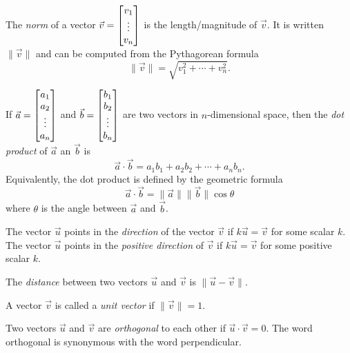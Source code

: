 \begin{SaveDefinition}[key=Norm, title={Norm}]
	The
	\emph{norm} of a vector $\vec v=\begin{bmatrix}v_1\\\vdots\\v_n\end{bmatrix}$ is the length/magnitude
	of $\vec v$. It is written $\|\vec v\|$ and can be computed from the Pythagorean
	formula
	\[
		\|\vec v\|=\sqrt{v_1^2+\cdots +v_n^2}.
	\]

\end{SaveDefinition}

\begin{SaveDefinition}[key=DotProduct, title={Dot Product}]
	If $\vec a=\begin{bmatrix}a_1\\a_2\\ \vdots\\a_n\end{bmatrix}$ and
	$\vec b=\begin{bmatrix}b_1\\b_2\\ \vdots\\b_n\end{bmatrix}$ are two vectors in $n$-dimensional
	space, then the
	\emph{dot product} of $\vec a$ an $\vec b$ is
	\[
		\vec a\cdot\vec b = a_{1}b_{1}+a_{2}b_{2}+\cdots+a_{n}b_{n}.
	\]
	 Equivalently, the dot product is defined by the geometric formula
	\[
		\vec a\cdot \vec b = \|\vec a\|\|\vec b\|\cos \theta
	\]
	 where $\theta$ is the angle between $\vec a$ and $\vec b$.
\end{SaveDefinition}

\begin{SaveDefinition}[key=Direction, title={Direction}]
	The vector $\vec u$ points in the \emph{direction} of
	the vector $\vec v$ if $k\vec u=\vec v$ for some scalar $k$.
	The vector $\vec u$ points in the \emph{positive direction} of
	$\vec v$ if $k\vec u=\vec v$ for some positive scalar $k$.
\end{SaveDefinition}

\begin{SaveDefinition}[key=Distance, title={Distance}]
	The
	\emph{distance} between two vectors $\vec u$ and $\vec v$ is
	$\|\vec u-\vec v\|$.
\end{SaveDefinition}

\begin{SaveDefinition}[key=UnitVector, title={Unit Vector}]
	A vector $\vec v$ is called a
	\emph{unit vector} if $\|\vec v\|=1$.
\end{SaveDefinition}

\begin{SaveDefinition}[key=Orthogonal, title={Orthogonal}]
	Two vectors $\vec u$ and $\vec v$ are
	\emph{orthogonal} to each other if $\vec u\cdot \vec v=0$. The word orthogonal
	is synonymous with the word perpendicular.
\end{SaveDefinition}

